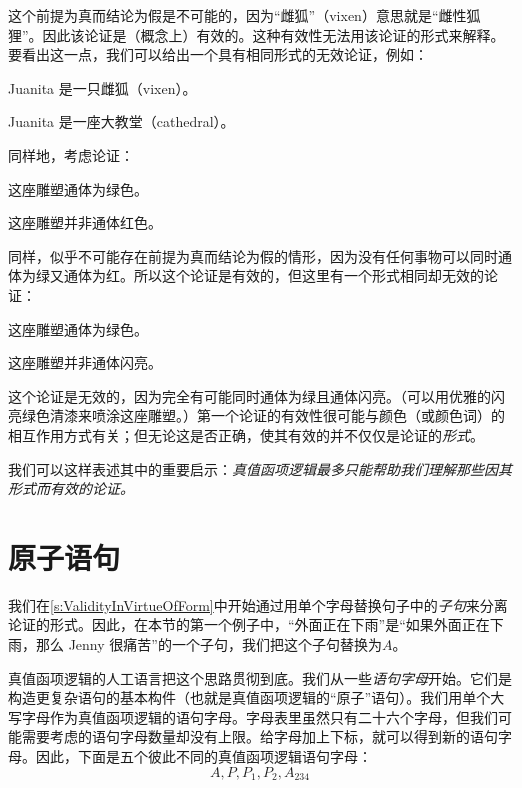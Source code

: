 这个前提为真而结论为假是不可能的，因为“雌狐”（vixen）意思就是“雌性狐狸”。因此该论证是（概念上）有效的。这种有效性无法用该论证的形式来解释。要看出这一点，我们可以给出一个具有相同形式的无效论证，例如：


\begin{earg}
		\item[] Juanita 是一只雌狐（vixen）。
		\item[\texttherefore] Juanita 是一座大教堂（cathedral）。
	\end{earg}


同样地，考虑论证：


\begin{earg}
		\item[] 这座雕塑通体为绿色。
		\item[\texttherefore] 这座雕塑并非通体红色。
	\end{earg}


同样，似乎不可能存在前提为真而结论为假的情形，因为没有任何事物可以同时通体为绿又通体为红。所以这个论证是有效的，但这里有一个形式相同却无效的论证：


\begin{earg}
		\item[] 这座雕塑通体为绿色。
		\item[\texttherefore] 这座雕塑并非通体闪亮。
	\end{earg}


这个论证是无效的，因为完全有可能同时通体为绿且通体闪亮。（可以用优雅的闪亮绿色清漆来喷涂这座雕塑。）第一个论证的有效性很可能与颜色（或颜色词）的相互作用方式有关；但无论这是否正确，使其有效的并不仅仅是论证的\emph{形式}。

我们可以这样表述其中的重要启示：\emph{真值函项逻辑最多只能帮助我们理解那些因其形式而有效的论证。}

\section{原子语句}

我们在\cref{s:ValidityInVirtueOfForm}中开始通过用单个字母替换句子中的\emph{子句}来分离论证的形式。因此，在本节的第一个例子中，“外面正在下雨”是“如果外面正在下雨，那么 Jenny 很痛苦”的一个子句，我们把这个子句替换为$A$。

真值函项逻辑的人工语言把这个思路贯彻到底。我们从一些\emph{语句字母}开始。它们是构造更复杂语句的基本构件（也就是真值函项逻辑的“原子”语句）。我们用单个大写字母作为真值函项逻辑的语句字母。字母表里虽然只有二十六个字母，但我们可能需要考虑的语句字母数量却没有上限。给字母加上下标，就可以得到新的语句字母。因此，下面是五个彼此不同的真值函项逻辑语句字母：
	$$A, P, P_1, P_2, A_{234}$$

